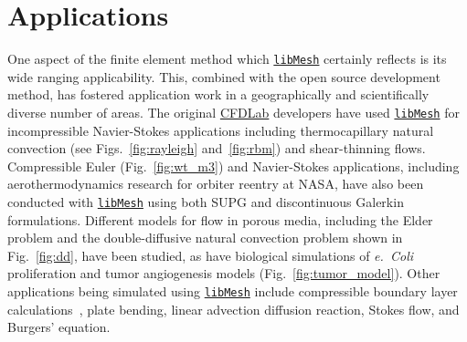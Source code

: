 \documentclass[global,twocolumn,final]{svjour}
\newcommand{\libMesh}{\href{http://libmesh.sourceforge.net}{\texttt{lib\-Mesh}}}
\newcommand{\CFDLab}{\href{http://cfdlab.ae.utexas.edu}{CFDLab}}
\begin{document}
\section{Applications\label{sec:apps}}
One aspect of the finite element method which \libMesh{} certainly
reflects is its wide ranging applicability.  This, combined with the
open source development method, has fostered application work in a
geographically and scientifically diverse number of areas.  The
original \CFDLab{} developers have used \libMesh{} for incompressible
Navier-Stokes applications including thermocapillary natural
convection (see Figs.~\ref{fig:rayleigh} and~\ref{fig:rbm}) and
shear-thinning flows.  Compressible Euler (Fig.~\ref{fig:wt_m3}) and
Navier-Stokes applications, including aerothermodynamics research for
orbiter reentry at NASA, have also been conducted with \libMesh{}
using both SUPG and discontinuous Galerkin formulations.  Different
models for flow in porous media, including the Elder problem and the
double-diffusive natural convection problem shown in
Fig.~\ref{fig:dd}, have been studied, as have biological simulations
of \emph{e.~Coli} proliferation and tumor angiogenesis models
(Fig.~\ref{fig:tumor_model}).  Other applications being simulated
using \libMesh{} include compressible boundary layer
calculations~\cite{kirk_AIAA-2006-0180}, plate bending, linear
advection diffusion reaction, Stokes flow, and Bur\-g\-ers' equation.
\end{document}
